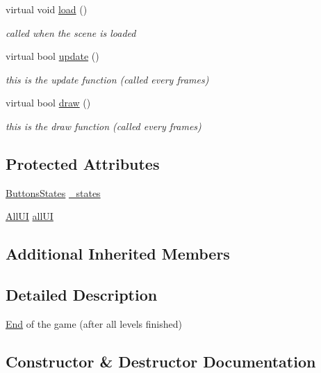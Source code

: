 \begin{DoxyCompactItemize}
\mbox{\label{class_scene_end_game_a8749fe7472fdde738d5cdc95efa9820e}} 
virtual void \hyperlink{class_scene_end_game_a8749fe7472fdde738d5cdc95efa9820e}{load} ()
\begin{DoxyCompactList}\small\item\em called when the scene is loaded \end{DoxyCompactList}\item 
virtual bool \hyperlink{class_scene_end_game_a36b55558e75b9cad9d17a28d8a1ce8d2}{update} ()
\begin{DoxyCompactList}\small\item\em this is the update function (called every frames) \end{DoxyCompactList}\item 
virtual bool \hyperlink{class_scene_end_game_a145614d80f41512a5bcf539278555d0c}{draw} ()
\begin{DoxyCompactList}\small\item\em this is the draw function (called every frames) \end{DoxyCompactList}\end{DoxyCompactItemize}
\subsection*{Protected Attributes}
\begin{DoxyCompactItemize}
\item 
\hyperlink{struct_scene_end_game_1_1_buttons_states}{Buttons\+States} \hyperlink{class_scene_end_game_a6623f0b349cebe0722e15a62037e03ab}{\+\_\+states}
\item 
\hyperlink{struct_scene_end_game_1_1_all_u_i}{All\+UI} \hyperlink{class_scene_end_game_a1b73f55b0481fd3bb5bd1b0e396f5139}{all\+UI}
\end{DoxyCompactItemize}
\subsection*{Additional Inherited Members}


\subsection{Detailed Description}
\hyperlink{class_end}{End} of the game (after all levels finished) 

\subsection{Constructor \& Destructor Documentation}
\mbox{\label{class_scene_end_game_ae0c333662c69d5f3699f77c6d9539b3e}} 
